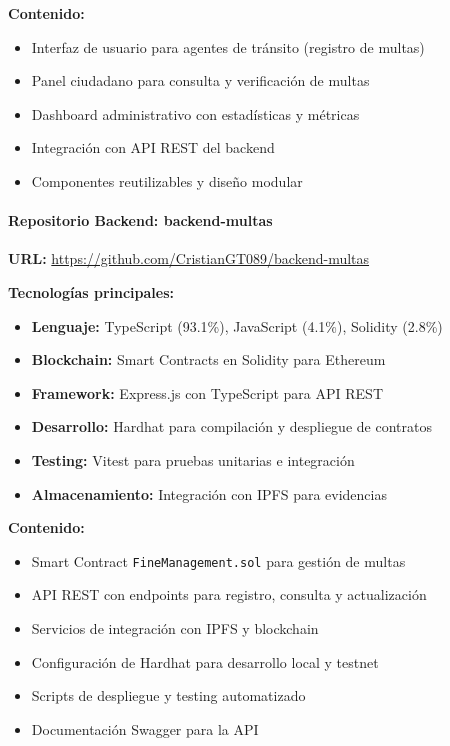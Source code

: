 \textbf{Contenido:}
\begin{itemize}
    \item Interfaz de usuario para agentes de tránsito (registro de multas)
    \item Panel ciudadano para consulta y verificación de multas
    \item Dashboard administrativo con estadísticas y métricas
    \item Integración con API REST del backend
    \item Componentes reutilizables y diseño modular
\end{itemize}

\paragraph{Repositorio Backend: backend-multas}
\textbf{URL:} \url{https://github.com/CristianGT089/backend-multas}

\textbf{Tecnologías principales:}
\begin{itemize}
    \item \textbf{Lenguaje:} TypeScript (93.1\%), JavaScript (4.1\%), Solidity (2.8\%)
    \item \textbf{Blockchain:} Smart Contracts en Solidity para Ethereum
    \item \textbf{Framework:} Express.js con TypeScript para API REST
    \item \textbf{Desarrollo:} Hardhat para compilación y despliegue de contratos
    \item \textbf{Testing:} Vitest para pruebas unitarias e integración
    \item \textbf{Almacenamiento:} Integración con IPFS para evidencias
\end{itemize}

\textbf{Contenido:}
\begin{itemize}
    \item Smart Contract \texttt{FineManagement.sol} para gestión de multas
    \item API REST con endpoints para registro, consulta y actualización
    \item Servicios de integración con IPFS y blockchain
    \item Configuración de Hardhat para desarrollo local y testnet
    \item Scripts de despliegue y testing automatizado
    \item Documentación Swagger para la API
\end{itemize}

